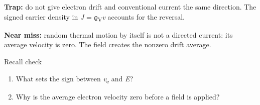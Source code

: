 \documentclass[11pt]{article}
\begin{document}
\begin{keepsection}
\begin{notebox}\textbf{Trap:} do not give electron drift and conventional current the same direction. The signed carrier density in \textit{J} = ϱ\textsubscript{V}\textit{v} accounts for the reversal.\end{notebox}

\begin{notebox}\textbf{Near miss:} random thermal motion by itself is not a directed current: its average velocity is zero. The field creates the nonzero drift average.\end{notebox}

\begin{recallbox}{Recall check}
\begin{enumerate}
\item What sets the sign between \textit{v}\textsubscript{e} and \textit{E}?
\item Why is the average electron velocity zero before a field is applied?
\end{enumerate}

\end{recallbox}
\end{keepsection}
\end{document}
